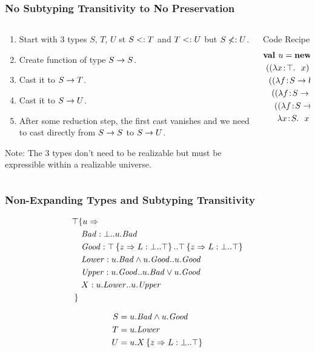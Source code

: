 \documentclass{beamer}
\begin{document}
  \begin{frame}
    \frametitle{No Subtyping Transitivity to No Preservation}
\begin{columns}
\begin{column}[t]{6cm}
\begin{enumerate}
\item Start with 3 types $S$, $T$, $U$ st $S <: T$ and $T <: U$ but $S \not<: U$.
\item Create function of type $S \rightarrow S$.
\item Cast it to $S \rightarrow T$.
\item Cast it to $S \rightarrow U$.
\item After some reduction step, the first cast vanishes and we need to cast directly from $S \rightarrow S$ to $S \rightarrow U$.
\end{enumerate}
Note: The 3 types don't need to be realizable but must be expressible within a realizable universe.
\end{column}
\begin{column}[t]{4cm}
\begin{block}{Code Recipe}
\begin{align*}
&\mlnew u \ldots {
\ \mlapp{\abs x \Top x}{
\ \ \mlapp{\abs f {S \tfun U} f}{
\ \ \ \mlapp{\abs f {S \tfun T} f}{
\ \ \ \ \mlapp{\abs f {S \tfun S} f}{
\ \ \  \ \ \abs x S x}}}}}
\end{align*}
\end{block}
\end{column}
\end{columns}
  \end{frame}

  \begin{frame}
    \frametitle{Non-Expanding Types and Subtyping Transitivity}
\begin{align*}
\top & \{u \Rightarrow \\
&\ \mathit{Bad} : \bot..u.\mathit{Bad}\\
&\ \mathit{Good} : \top \left\{z \Rightarrow L : \bot..\top \right\}..\top \left\{z \Rightarrow L : \bot..\top \right\}\\
&\ \mathit{Lower} : u.\mathit{Bad} \wedge u.\mathit{Good}..u.\mathit{Good}\\
&\ \mathit{Upper} : u.\mathit{Good}..u.\mathit{Bad} \vee u.\mathit{Good}\\
&\ X : u.\mathit{Lower}..u.\mathit{Upper}\\
 \}&
\end{align*}

\begin{align*}
S &= u.\mathit{Bad} \wedge u.\mathit{Good}\\
T &= u.\mathit{Lower}\\
U &= u.X \left\{z \Rightarrow L : \bot..\top \right\}
\end{align*}
  \end{frame}
\end{document}
